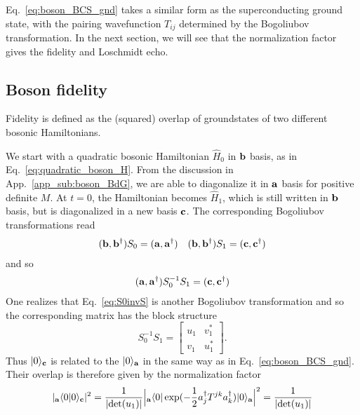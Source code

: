 Eq.~\eqref{eq:boson_BCS_gnd} takes a similar form as the superconducting ground state, with the pairing wavefunction $T_{ij}$ determined by the Bogoliubov transformation. In the next section, we will see that the normalization factor gives the fidelity and Loschmidt echo.

\subsection{Boson fidelity} 
\label{app_sub:boson_fidelity}

Fidelity is defined as the (squared) overlap of groundstates of two different bosonic Hamiltonians. 

We start with a quadratic bosonic Hamiltonian $\hat{H}_0$ in ${\bf b}$ basis, as in Eq.~\eqref{eq:quadratic_boson_H}. From the discussion in App.~\ref{app_sub:boson_BdG}, we are able to diagonalize it in ${\bf a}$ basis for positive definite $M$. At $t=0$, the Hamiltonian becomes $\hat{H}_1$, which is still written in ${\bf b}$ basis, but is diagonalized in a new basis ${\bf c}$. The corresponding Bogoliubov transformations read
\begin{equation}\begin{aligned}
\label{eq:two_BdG}
({\bf b} , {\bf b}^\dagger)S_0=({\bf a} , {\bf a}^\dagger)\quad
({\bf b} , {\bf b}^\dagger)S_1=({\bf c} , {\bf c}^\dagger)
\end{aligned}\end{equation}
and so
\begin{equation}\begin{aligned}
\label{eq:S0invS}
({\bf a} , {\bf a}^\dagger)S_0^{-1}S_1=({\bf c} , {\bf c}^\dagger)
\end{aligned}\end{equation}
One realizes that Eq.~\eqref{eq:S0invS} is another Bogoliubov transformation and so the corresponding matrix has the block structure
\begin{equation}
S_0^{-1}S_1=\begin{bmatrix}
u_1 & v_1^*\\
v_1 & u_1^*
\end{bmatrix}.
\end{equation}
Thus $|0\rangle_{\bf c}$ is related to the $|0\rangle_{{\bf a}}$ in the same way as in Eq.~\eqref{eq:boson_BCS_gnd}. Their overlap is therefore given by the normalization factor
\begin{equation}\begin{aligned}
|{}_{\bf a}\langle0|0\rangle_{\bf c}|^2=\frac{1}{|\text{det}(u_1)|} \Big|{}_{\bf a}\langle 0 | \exp( -\frac{1}{2} a_j^{\dagger} T^{jk} a_k^{\dagger} )|0   \rangle_{\bf a} \Big|^2   = \frac{1}{|\text{det}(u_1)|}
\end{aligned}\end{equation}

